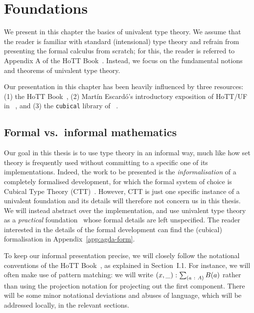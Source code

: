 \chapter{Foundations}\label{chap:foundations}

We present in this chapter the basics of univalent type theory. We assume that the reader
is familiar with standard (intensional) type theory and refrain from presenting the formal
calculus from scratch; for this, the reader is referred to Appendix A of the HoTT
Book~\cite{hottbook}. Instead, we focus on the fundamental notions and theorems of
univalent type theory.

Our presentation in this chapter has been heavily influenced by three resources: (1) the
HoTT Book~\cite{hottbook}, (2) Martín Escardó's introductory exposition of HoTT/UF in
\veragda{}~\cite{escardo-uf-intro}, and (3) the \texttt{cubical} library of
\veragda{}~\cite{agda-cubical}.

\section{Formal vs.~informal mathematics}

Our goal in this thesis is to use type theory in an informal way, much like how set theory
is frequently used without committing to a specific one of its implementations. Indeed,
the work to be presented is the \emph{informalisation} of a completely formalised
development, for which the formal system of choice is Cubical Type Theory
(CTT)~\cite{CCHM, cubical-agda}. However, CTT is just one specific instance of a univalent
foundation and its details will therefore not concern us in this thesis. We will instead
abstract over the implementation, and use univalent type theory as a \emph{practical}
foundation~\cite{PFOM, PFPL} whose formal details are left unspecified. The reader
interested in the details of the formal development can find the (cubical) \veragda{}
formalisation in Appendix~\ref{app:agda-form}.

To keep our informal presentation precise, we will closely follow the notational
conventions of the HoTT Book~\cite{hottbook}, as explained in Section~I.1. For instance,
we will often make use of pattern matching: we will write
$(x, \_)\hspace{0.1mm}:\hspace{0.1mm}\sum_{(a~:~A)} B(a)$ rather than using the projection notation for
projecting out the first component. There will be some minor notational deviations and
abuses of language, which will be addressed locally, in the relevant sections.

